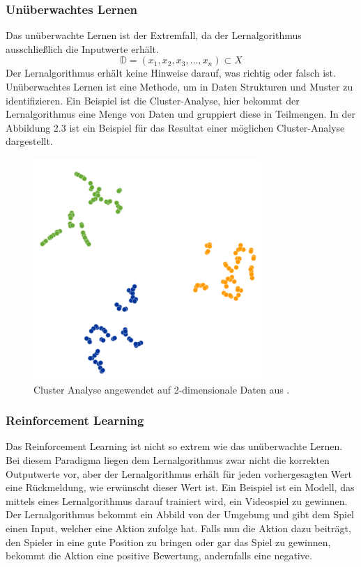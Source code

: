 \documentclass[12pt,letterpaper,ngerman]{article}
\begin{document}
\subsubsection{Unüberwachtes Lernen}
Das unüberwachte Lernen ist der Extremfall, da der Lernalgorithmus
ausschließlich die Inputwerte erhält.
\[\mathbb{D} = (x_1, x_2, x_3, \dots, x_n) \subset X\]
Der Lernalgorithmus erhält keine Hinweise darauf, was richtig oder falsch 
ist. Unüberwachtes Lernen ist eine Methode, um in Daten Strukturen und 
Muster zu identifizieren. Ein Beispiel ist die Cluster-Analyse, hier
bekommt der Lernalgorithmus eine Menge von Daten und gruppiert diese in
Teilmengen. In der Abbildung 2.3 ist ein Beispiel für das Resultat einer
möglichen Cluster-Analyse dargestellt.
\begin{figure}[H]
  \centering
  \includegraphics[scale=0.3]{abb/t-sne-example.png}
  \caption{Cluster Analyse angewendet auf 2-dimensionale Daten aus 
  \cite{wattenberg2016how}.}
\end{figure}

\subsubsection{Reinforcement Learning}
Das Reinforcement Learning ist nicht so extrem wie das unüberwachte Lernen. 
Bei diesem Paradigma liegen dem Lernalgorithmus zwar nicht die korrekten 
Outputwerte vor, aber der Lernalgorithmus erhält für jeden vorhergesagten Wert 
eine Rückmeldung, wie erwünscht dieser Wert ist. Ein Beispiel ist ein Modell,
das mittels eines Lernalgorithmus darauf trainiert wird, ein Videospiel zu 
gewinnen. Der Lernalgorithmus bekommt ein Abbild von der Umgebung und gibt dem 
Spiel einen Input, welcher eine Aktion zufolge hat. Falls nun die Aktion dazu 
beiträgt, den Spieler in eine gute Position zu bringen oder gar das Spiel zu
gewinnen, bekommt die Aktion eine positive Bewertung, andernfalls eine
negative. \\
\end{document}
